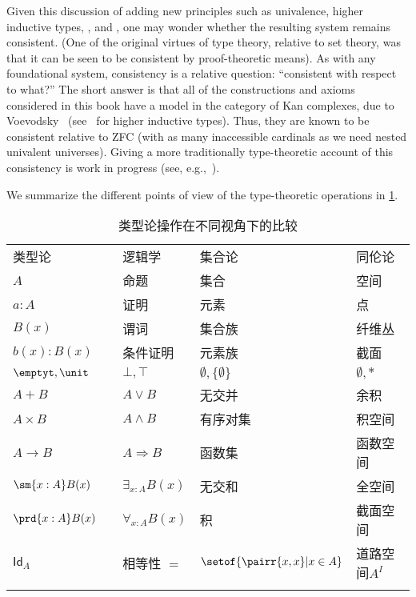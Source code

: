 Given this discussion of adding new principles such as univalence, higher inductive types, \choice{}, and \LEM{}, one may wonder whether the resulting system remains consistent.
(One of the original virtues of type theory, relative to set theory, was that it can be seen to be consistent by proof-theoretic means).
As with any foundational system, consistency is a relative question: ``consistent with respect to what?''
The short answer is that all of the constructions and axioms considered in this book have a model in the category of Kan complexes,
due to Voevodsky~\cite{klv:ssetmodel} (see~\cite{ls:hits} for higher inductive types).
Thus, they are known to be consistent relative to ZFC (with as many inaccessible cardinals
%
as we need nested univalent universes).
Giving a more traditionally type-theoretic account of this consistency is work in progress (see,
e.g.,~\cite{lh:canonicity,coquand2012constructive}).

We summarize the different points of view of the type-theoretic operations in \cref{tab:pov}.

\begin{table}[htb]
  \centering
  \OPTsmalltable
 \begin{tabular}{lllll}
    \toprule
       类型论 && 逻辑学 & 集合论 & 同伦论\\ \addlinespace[2pt]
    \midrule
       $A$ && 命题 & 集合 & 空间\\ \addlinespace[2pt]
       $a:A$ && 证明 & 元素 & 点 \\ \addlinespace[2pt]
       $B(x)$ && 谓词 & 集合族 & 纤维丛 \\ \addlinespace[2pt]
       $b(x) : B(x)$ && 条件证明 & 元素族 & 截面\\ \addlinespace[2pt]
       $\emptyt, \unit$ && $\bot, \top$ & $\emptyset, \{ \emptyset \}$ & $\emptyset, *$\\ \addlinespace[2pt]
       $A + B$ && $A\vee B$ & 无交并 & 余积 \\ \addlinespace[2pt]
       $A\times B$ && $A\wedge B$ & 有序对集 & 积空间 \\ \addlinespace[2pt]
       $A\to B$ && $A\Rightarrow B$ & 函数集 & 函数空间 \\ \addlinespace[2pt]
       $\sm{x:A}B(x)$ &&  $\exists_{x:A}B(x)$ & 无交和 & 全空间 \\ \addlinespace[2pt]
       $\prd{x:A}B(x)$ &&  $\forall_{x:A}B(x)$ & 积 & 截面空间 \\ \addlinespace[2pt]
       $\mathsf{Id}_{A}$ && 相等性 $=$ & $\setof{\pairr{x,x} | x\in A}$ & 道路空间$A^I$ \\ \addlinespace[2pt]
    \bottomrule
  \end{tabular}
  \caption{类型论操作在不同视角下的比较}\label{tab:pov}
\end{table}

